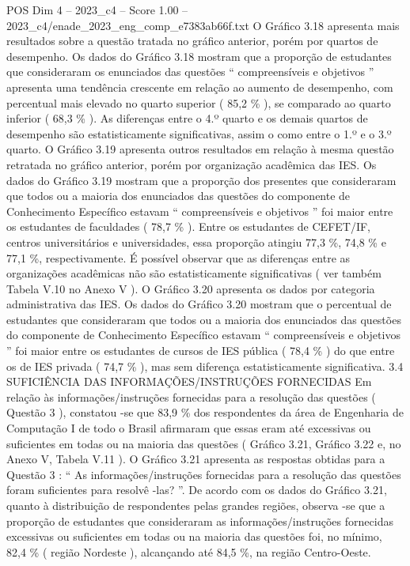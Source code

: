 \begin{textsample}{POS Dim 4 – 2023\_c4 – Score 1.00 – 2023\_c4/enade\_2023\_eng\_comp\_e7383ab66f.txt}
O Gráfico 3.18 apresenta mais resultados sobre a questão tratada no gráfico anterior, porém por quartos de desempenho.
Os dados do Gráfico 3.18 mostram que a proporção de estudantes que consideraram os enunciados das questões “ compreensíveis e objetivos ” apresenta uma tendência crescente em relação ao aumento de desempenho, com percentual mais elevado no quarto superior ( 85,2 \% ), se comparado ao quarto inferior ( 68,3 \% ).
As diferenças entre o 4.º quarto e os demais quartos de desempenho são estatisticamente significativas, assim o como entre o 1.º e o 3.º quarto.
O Gráfico 3.19 apresenta outros resultados em relação à mesma questão retratada no gráfico anterior, porém por organização acadêmica das IES.
Os dados do Gráfico 3.19 mostram que a proporção dos presentes que consideraram que todos ou a maioria dos enunciados das questões do componente de Conhecimento Específico estavam “ compreensíveis e objetivos ” foi maior entre os estudantes de faculdades ( 78,7 \% ).
Entre os estudantes de CEFET/IF, centros universitários e universidades, essa proporção atingiu 77,3 \%, 74,8 \% e 77,1 \%, respectivamente.
É possível observar que as diferenças entre as organizações acadêmicas não são estatisticamente significativas ( ver também Tabela V.10 no Anexo V ).
O Gráfico 3.20 apresenta os dados por categoria administrativa das IES.
Os dados do Gráfico 3.20 mostram que o percentual de estudantes que consideraram que todos ou a maioria dos enunciados das questões do componente de Conhecimento Específico estavam “ compreensíveis e objetivos ” foi maior entre os estudantes de cursos de IES pública ( 78,4 \% ) do que entre os de IES privada ( 74,7 \% ), mas sem diferença estatisticamente significativa. 3.4 SUFICIÊNCIA DAS INFORMAÇÕES/INSTRUÇÕES FORNECIDAS Em relação às informações/instruções fornecidas para a resolução das questões ( Questão 3 ), constatou -se que 83,9 \% dos respondentes da área de Engenharia de Computação I de todo o Brasil afirmaram que essas eram até excessivas ou suficientes em todas ou na maioria das questões ( Gráfico 3.21, Gráfico 3.22 e, no Anexo V, Tabela V.11 ).
O Gráfico 3.21 apresenta as respostas obtidas para a Questão 3 : “ As informações/instruções fornecidas para a resolução das questões foram suficientes para resolvê -las? ”.
De acordo com os dados do Gráfico 3.21, quanto à distribuição de respondentes pelas grandes regiões, observa -se que a proporção de estudantes que consideraram as informações/instruções fornecidas excessivas ou suficientes em todas ou na maioria das questões foi, no mínimo, 82,4 \% ( região Nordeste ), alcançando até 84,5 \%, na região Centro-Oeste.

\end{textsample}
